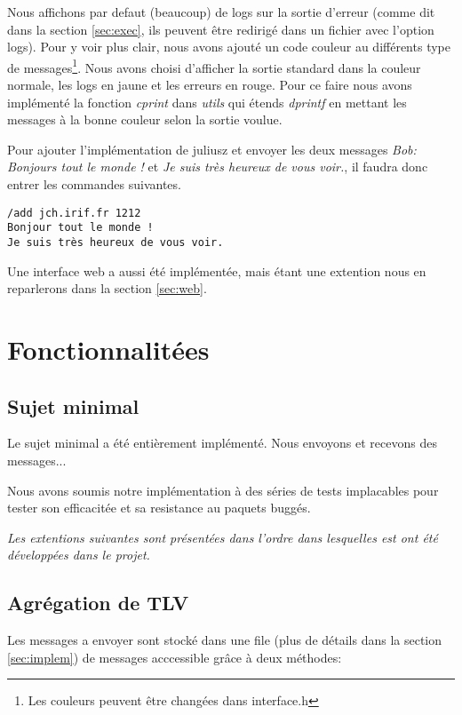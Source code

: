 \documentclass[a4paper,10pt]{article} %
\begin{document}
Nous affichons par defaut (beaucoup) de logs sur la sortie d'erreur (comme dit dans la section \ref{sec:exec}, ils peuvent être redirigé dans un fichier avec l'option \textrm{logs}). Pour y voir plus clair, nous avons ajouté un code couleur au différents type de messages\footnote{Les couleurs peuvent être changées dans \textrm{interface.h}}. Nous avons choisi d'afficher la sortie standard dans la couleur normale, les logs en jaune et les erreurs en rouge. Pour ce faire nous avons implémenté la fonction \textit{cprint} dans \textit{utils} qui étends \textit{dprintf} en mettant les messages à la bonne couleur selon la sortie voulue.


Pour ajouter l'implémentation de juliusz et envoyer les deux messages \textit{Bob: Bonjours tout le monde !} et \textit{Je suis très heureux de vous voir.}, il faudra donc entrer les commandes suivantes.

\begin{verbatim}
/add jch.irif.fr 1212
Bonjour tout le monde !
Je suis très heureux de vous voir.
\end{verbatim}

Une interface web a aussi été implémentée, mais étant une extention nous en reparlerons dans la section \ref{sec:web}.

\section{Fonctionnalitées}

\subsection{Sujet minimal}
Le sujet minimal a été entièrement implémenté.
Nous envoyons et recevons des messages...

Nous avons soumis notre implémentation à des séries de tests implacables pour tester son efficacitée et sa resistance au paquets buggés.


\textit{Les extentions suivantes sont présentées dans l'ordre dans lesquelles est ont été développées dans le projet.}

\subsection{Agrégation de TLV\label{sec:agrega}}
Les messages a envoyer sont stocké dans une file (plus de détails dans la section \ref{sec:implem}) de messages acccessible grâce à deux méthodes:
\end{document}
